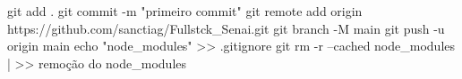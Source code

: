 git add .
git commit -m "primeiro commit"
git remote add origin https://github.com/sanctiag/Fullstck_Senai.git
git branch -M main
git push -u origin main
echo "node_modules" >> .gitignore
git rm -r --cached node_modules | >> remoção do node_modules
